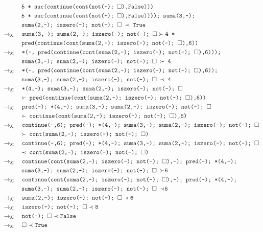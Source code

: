 \documentclass{article}
\newcommand{\tx}[1]{\textcolor{Black} {\texttt{#1}}}
\newcommand{\es}{$\square$}
\newcommand{\pop}[2]{ \tx{#1} \succ \tx{#2}}
\newcommand{\push}[2]{ \tx{#1} \prec \tx{#2}}
\newcommand{\kr}{\rightarrow_{\mathcal{K}} \quad}
\begin{document}
\begin{enumerate}
\begin{enumerate}
\begin{align*}
			&\tx{\quad \quad \quad 5 * suc(continue(cont(not(-); \es),False)))}\\
			&\tx {\quad \quad \quad 5 * suc(continue(cont(not(-); \es),False)))); suma(3,-);}\\
			&\tx{\quad \quad \quad suma(2,-); iszero(-); not(-); \es $\ \prec $ True} \\			
			&\kr \pop{suma(3,-); suma(2,-); iszero(-); not(-); \es} {4 *}\\
			&\tx{\quad \quad \quad pred(continue(cont(suma(2,-); iszero(-); not(-); \es),6))} \\
			&\kr \tx{*(-, pred(continue(cont(suma(2,-); iszero(-); not(-); \es),6)));}\\
			&\tx{\quad \quad \quad suma(3,-); suma(2,-); iszero(-); not(-); \es $\ \succ $ 4}\\
			&\kr \tx{*(-, pred(continue(cont(suma(2,-); iszero(-); not(-); \es),6));}\\
			&\tx{\quad \quad \quad suma(3,-); suma(2,-); iszero(-); not(-); \es $\ \prec $ 4}\\
			&\kr \tx{*(4,-); suma(3,-); suma(2,-); iszero(-); not(-); \es}\\
			&\tx{\quad \quad \quad $\succ $ pred(continue(cont(suma(2,-); iszero(-); not(-); \es),6))}\\
			&\kr \tx{pred(-); *(4,-); suma(3,-); suma(2,-); iszero(-); not(-); \es}\\
			&\tx{\quad \quad \quad $\succ $ continue(cont(suma(2,-); iszero(-); not(-); \es),6)}\\
			&\kr \tx{continue(-,6); pred(-); *(4,-); suma(3,-); suma(2,-); iszero(-); not(-); \es}\\
			&\tx{\quad \quad \quad $\succ $ cont(suma(2,-); iszero(-); not(-); \es)}\\
			&\kr \tx{continue(-,6); pred(-); *(4,-); suma(3,-); suma(2,-); iszero(-); not(-); \es}\\
			&\tx{\quad \quad \quad $\prec $ cont(suma(2,-); iszero(-); not(-); \es)}\\
			&\kr \tx{continue(cont(suma(2,-); iszero(-); not(-); \es),-); pred(-); *(4,-);}\\
			&\tx {\quad \quad \quad suma(3,-); suma(2,-); iszero(-); not(-); \es  $\ \succ $6}\\
			&\kr \tx{continue(cont(suma(2,-); iszero(-); not(-); \es),-); pred(-); *(4,-);}\\
			&\tx {\quad \quad \quad suma(3,-); suma(2,-); iszero(-); not(-); \es  $\ \prec $6}\\
			&\kr \push {suma(2,-); iszero(-); not(-); \es}{6}\\
			&\kr \push {iszero(-); not(-); \es}{8}\\
			&\kr \push {not(-); \es}{False}\\
			&\kr \push {\es}{True}\\
			\end{align*} 


\end{enumerate}
\end{enumerate}
\end{document}
